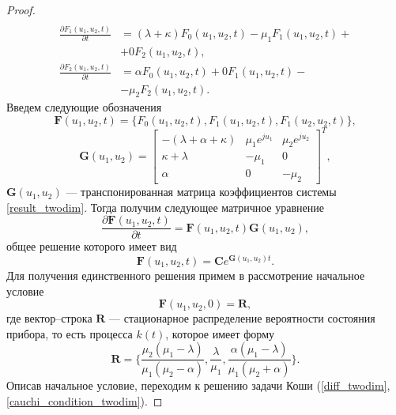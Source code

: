 \begin{proof}
\begin{equation}
\begin{split}
			\\
			\frac{{\partial F_{1}(u_{1},u_{2},t)}}{{\partial t}} &= (\lambda + \kappa)F_{0}(u_{1},u_{2},t) -  
			\mu_{1}F_{1}(u_{1},u_{2},t) +\\  &+  0F_{2}(u_{1},u_{2},t) ,
			\\
			\frac{{\partial F_{2}(u_{1},u_{2},t)}}{{\partial t}} &= \alpha F_{0}(u_{1},u_{2},t)   +  0F_{1}(u_{1},u_{2},t) -\\  &- \mu_{2}F_{2}(u_{1},u_{2},t).
		\end{split}
	\end{equation}  
	Введем следующие обозначения
	\begin{equation*}
		\boldsymbol{F}(u_{1},u_{2},t) = \{F_{0}(u_{1},u_{2},t),F_{1}(u_{1},u_{2},t),F_{1}(u_{2},u_{2},t)\},
	\end{equation*}  
	\begin{equation*}
		\boldsymbol{G}(u_{1},u_{2})=\begin{bmatrix}
			-(\lambda + \alpha + \kappa) & \mu_{1}e^{ju_{1}} &  \mu_{2}e^{ju_{2}}\\
			\kappa+\lambda & -\mu_{1} & 0\\
			\alpha & 	0 &	-\mu_{2}
		\end{bmatrix}^{T},
	\end{equation*}
	$\boldsymbol{G}(u_{1},u_{2})$ --- транспонированная матрица коэффициентов системы \eqref{result_twodim}.
	Тогда получим следующее матричное уравнение
	\begin{equation*}
		\frac{{\partial \boldsymbol{F}(u_{1},u_{2},t)}}{{\partial t}} =\boldsymbol{F}(u_{1},u_{2},t)\boldsymbol{G}(u_{1},u_{2}),
	\end{equation*}
	общее решение которого имеет вид
	\begin{equation} \label{diff_twodim}
		\boldsymbol{F}(u_{1},u_{2},t)=\boldsymbol{C}e^{\boldsymbol{G}(u_{1},u_{2})t}.
	\end{equation}
	Для получения единственного решения примем в рассмотрение начальное условие
	\begin{equation} \label{cauchi_condition_twodim}
		\boldsymbol{F}(u_{1},u_{2},0)=\boldsymbol{R},
	\end{equation}
	где вектор--строка $\boldsymbol{R}$ --- стационарное распределение вероятности состояния прибора, то есть процесса $k(t)$, которое имеет форму \cite{nazarov2017asymptotic}
	\begin{equation*}
		\boldsymbol{R}=\{\frac{\mu_{2}(\mu_{1} - \lambda)}{\mu_{1}(\mu_{2} - \alpha)},\frac{\lambda}{\mu_{1}},\frac{\alpha(\mu_{1} - \lambda)}{\mu_{1}(\mu_{2} + \alpha)}\}.
	\end{equation*}
	Описав начальное условие, переходим к решению задачи Коши (\ref{diff_twodim}, \ref{cauchi_condition_twodim}).
	

\end{proof}
